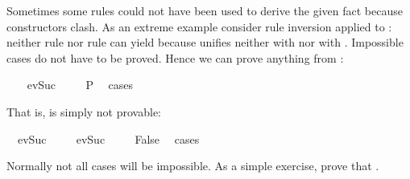 \begin{isabellebody}
\begin{isamarkuptext}
Sometimes some rules could not have been used to derive the given fact
because constructors clash. As an extreme example consider
rule inversion applied to : neither rule  nor
rule  can yield  because  unifies
neither with  nor with . Impossible cases do not
have to be proved. Hence we can prove anything from :%
\end{isamarkuptext}%
\isamarkuptrue%
%
\isadelimproof
%
\endisadelimproof
%
\isatagproof
\ \ \isamarkupfalse%
\ {}ev{}Suc\ {}{}{}\ \isamarkupfalse%
\ \isamarkupfalse%
\ P\ \isamarkupfalse%
\ cases%
\endisatagproof
{\isafoldproof}%
%
\isadelimproof
%
\endisadelimproof
%
\begin{isamarkuptext}%
That is,  is simply not provable:%
\end{isamarkuptext}%
\isamarkuptrue%
\isamarkupfalse%
\ {}{}\ ev{}Suc\ {}{}{}\isanewline
%
\isadelimproof
%
\endisadelimproof
%
\isatagproof
{}\isamarkupfalse%
\isanewline
\ \ \isamarkupfalse%
\ {}ev{}Suc\ {}{}{}\ \isamarkupfalse%
\ \isamarkupfalse%
\ False\ \isamarkupfalse%
\ cases\isanewline
{}\isamarkupfalse%
%
\endisatagproof
{\isafoldproof}%
%
\isadelimproof
%
\endisadelimproof
%
\begin{isamarkuptext}%
Normally not all cases will be impossible. As a simple exercise,
prove that \mbox{.}%
\end{isamarkuptext}%
\isamarkuptrue%
%
\isadelimtheory
%
\endisadelimtheory
%
\isatagtheory
%
\endisatagtheory
{\isafoldtheory}%
%
\isadelimtheory
%
\endisadelimtheory
\end{isabellebody}%
